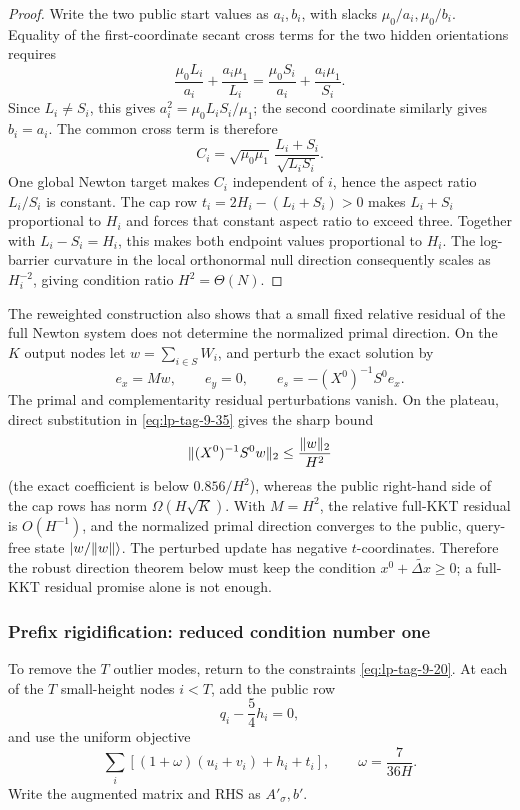 \begin{proof}
Write the two public start values as \(a_i,b_i\), with slacks
\(\mu_0/a_i,\mu_0/b_i\).  Equality of the first-coordinate secant cross
terms for the two hidden orientations requires
\[
 \frac{\mu_0L_i}{a_i}+\frac{a_i\mu_1}{L_i}
 =\frac{\mu_0S_i}{a_i}+\frac{a_i\mu_1}{S_i}.
\]
Since \(L_i\ne S_i\), this gives
\(a_i^2=\mu_0L_iS_i/\mu_1\); the second coordinate similarly gives
\(b_i=a_i\).  The common cross term is therefore
\[
 C_i=\sqrt{\mu_0\mu_1}\,
       \frac{L_i+S_i}{\sqrt{L_iS_i}}.
\]
One global Newton target makes \(C_i\) independent of \(i\), hence the
aspect ratio \(L_i/S_i\) is constant.  The cap row
\(t_i=2H_i-(L_i+S_i)>0\) makes \(L_i+S_i\) proportional to \(H_i\) and
forces that constant aspect ratio to exceed three.  Together with
\(L_i-S_i=H_i\), this makes both endpoint values proportional to \(H_i\).
The log-barrier curvature in the local orthonormal null direction
consequently scales as \(H_i^{-2}\), giving condition ratio
\(H^2=\Theta(N)\).
\end{proof}

The reweighted construction also shows that a small fixed relative residual
of the full Newton system does not determine the normalized primal
direction.  On the \(K\) output nodes let
\(w=\sum_{i\in S}W_i\), and perturb the exact solution by
\begin{equation}
 e_x=Mw,\qquad e_y=0,\qquad
 e_s=-(X^0)^{-1}S^0e_x.
\end{equation}
The primal and complementarity residual perturbations vanish.  On the
plateau, direct substitution in \eqref{eq:lp-tag-9-35} gives the sharp bound
\[
 \lVert(X^0)^{-1}S^0w\rVert_2\leq\frac{\lVert w\rVert_2}{H^2}
\]
(the exact coefficient is below \(0.856/H^2\)), whereas the public
right-hand side of the cap rows has norm \(\Omega(H\sqrt K)\).  With
\(M=H^2\), the relative full-KKT residual is \(O(H^{-1})\), and the
normalized primal direction converges to the public, query-free state
\(\lvert w/\lVert w\rVert\rangle\).  The perturbed update has
negative \(t\)-coordinates.  Therefore the robust direction theorem below
must keep the condition \(x^0+\widetilde{\Delta x}\geq0\); a full-KKT residual
promise alone is not enough.

\subsubsection{Prefix rigidification: reduced condition number one}
\label{sec:lp-prefix-rigidified}

To remove the \(T\) outlier modes, return to the constraints
\eqref{eq:lp-tag-9-20}.  At each of the \(T\)
small-height nodes \(i<T\), add the public row
\begin{equation}
 q_i-\frac54h_i=0,
\label{eq:lp-tag-9-44}
\end{equation}
and use the uniform objective
\begin{equation}
 \sum_i[(1+\omega)(u_i+v_i)+h_i+t_i],
 \qquad \omega=\frac7{36H}.
\end{equation}
Write the augmented matrix and RHS as \(A'_\sigma,b'\).


